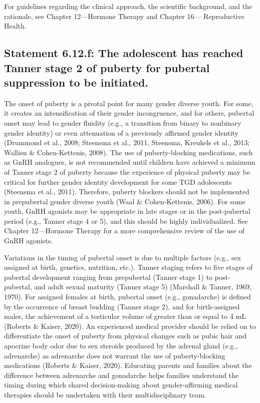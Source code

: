 \documentclass[
]{book}
\begin{document}
For guidelines regarding the clinical approach,
the scientific background, and the rationale, see
Chapter 12---Hormone Therapy and Chapter 16---
Reproductive Health.

\hypertarget{statement-6.12.f-the-adolescent-has-reached-tanner-stage-2-of-puberty-for-pubertal-suppression-to-be-initiated.}{%
\subsection*{Statement 6.12.f: The adolescent has reached Tanner stage 2 of puberty for pubertal suppression to be initiated.}\label{statement-6.12.f-the-adolescent-has-reached-tanner-stage-2-of-puberty-for-pubertal-suppression-to-be-initiated.}}

The onset of puberty is a pivotal point for
many gender diverse youth. For some, it creates
an intensification of their gender incongruence,
and for others, pubertal onset may lead to gender
fluidity (e.g., a transition from binary to nonbinary gender identity) or even attenuation of a
previously affirmed gender identity (Drummond
et al., 2008; Steensma et al., 2011, Steensma,
Kreukels et al., 2013; Wallien \& Cohen-Kettenis,
2008). The use of puberty-blocking medications,
such as GnRH analogues, is not recommended
until children have achieved a minimum of
Tanner stage 2 of puberty because the experience
of physical puberty may be critical for further
gender identity development for some TGD adolescents (Steensma et al., 2011). Therefore,
puberty blockers should not be implemented in
prepubertal gender diverse youth (Waal \&
Cohen-Kettenis, 2006). For some youth, GnRH
agonists may be appropriate in late stages or in
the post-pubertal period (e.g., Tanner stage 4 or
5), and this should be highly individualized. See
Chapter 12---Hormone Therapy for a more comprehensive review of the use of GnRH agonists.

Variations in the timing of pubertal onset is
due to multiple factors (e.g., sex assigned at birth,
genetics, nutrition, etc.). Tanner staging refers to
five stages of pubertal development ranging from
prepubertal (Tanner stage 1) to post-pubertal,
and adult sexual maturity (Tanner stage 5)
(Marshall \& Tanner, 1969, 1970). For assigned
females at birth, pubertal onset (e.g., gonadarche)
is defined by the occurrence of breast budding
(Tanner stage 2), and for birth-assigned males,
the achievement of a testicular volume of greater
than or equal to 4 mL (Roberts \& Kaiser, 2020).
An experienced medical provider should be relied
on to differentiate the onset of puberty from
physical changes such as pubic hair and apocrine
body odor due to sex steroids produced by the
adrenal gland (e.g., adrenarche) as adrenarche
does not warrant the use of puberty-blocking
medications (Roberts \& Kaiser, 2020). Educating
parents and families about the difference between
adrenarche and gonadarche helps families understand the timing during which shared
decision-making about gender-affirming medical
therapies should be undertaken with their multidisciplinary team.
\end{document}
